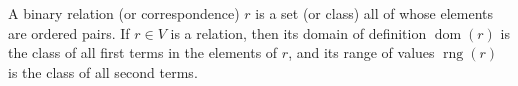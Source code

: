A binary relation (or correspondence) $r$ is a set (or class) all of whose elements are ordered pairs. If $r \in V$ is a relation, then its domain of definition $\operatorname{dom}(r)$ is the class of all first terms in the elements of $r$, and its range of values $\operatorname{rng}(r)$ is the class of all second terms.
